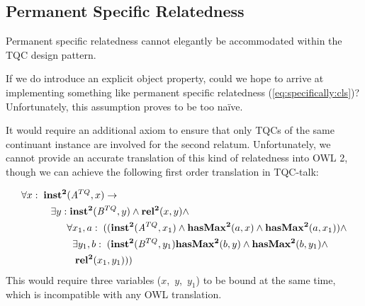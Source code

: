 \subsection*{Permanent Specific Relatedness}
Permanent specific relatedness cannot elegantly be accommodated within the TQC design pattern. 

If we do introduce an explicit object property, could we hope to arrive at
implementing something like permanent specific relatedness
(\ref{eq:specifically:cls})? Unfortunately, this assumption proves to be too na\"ive.

It would require an additional axiom to ensure that only TQCs of the same continuant instance are involved
for the second relatum. Unfortunately, we cannot provide an
accurate translation of this kind of relatedness into OWL 2, though we can
achieve the following first order translation in TQC-talk:

 \begin{equation}
\begin{split}
\forall x:\; \mathrm{\mathbf{inst^2}}&(\mathit{A}^{TQ},x) \rightarrow \\
 \exists y:&\;\mathrm{\mathbf{inst^2}}(\mathit{B}^{TQ},y) \wedge \mathrm{\mathbf{rel^2}}(x,y)\wedge\\
 & \forall x_1,a:\; ((\mathrm{\mathbf{inst^2}}(\mathit{A}^{TQ},x_1) \wedge
\mathrm{\mathbf{hasMax^2}}(a,x) \wedge \mathrm{\mathbf{hasMax^2}}(a,x_1))\wedge\\
&\;\;\exists y_1,b:\;(\mathrm{\mathbf{inst^2}}(\mathit{B}^{TQ},y_1) \mathrm{\mathbf{hasMax^2}}(b,y)  
\wedge \mathrm{\mathbf{hasMax^2}}(b,y_1) \wedge\\&\;\;\;\mathrm{\mathbf{rel^2}}(x_1,y_1)))
\end{split}
\end{equation}
This would require three variables ($x$,~$y$,~$y_1$) to be bound at the same
time, which is incompatible with any OWL translation.

